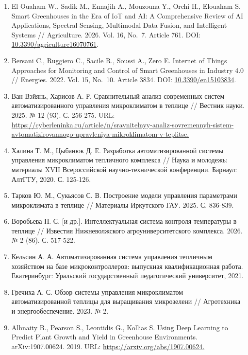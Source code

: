 \documentclass[a4paper,14pt]{extarticle}
\providecommand{\tightlist}{%
  \setlength{\itemsep}{0pt}\setlength{\parskip}{0pt}}
\begin{document}
\begin{enumerate}
\def\labelenumi{\arabic{enumi}.}
\tightlist
\item
  El Ouaham W., Sadik M., Ennajih A., Mouzouna Y., Orchi H., Elouaham S.
  Smart Greenhouses in the Era of IoT and AI: A Comprehensive Review of
  AI Applications, Spectral Sensing, Multimodal Data Fusion, and
  Intelligent Systems // Agriculture. 2026. Vol. 16, No.~7. Article 761.
  DOI:
  \href{https://doi.org/10.3390/agriculture16070761}{10.3390/agriculture16070761}.
\item
  Bersani C., Ruggiero C., Sacile R., Soussi A., Zero E. Internet of
  Things Approaches for Monitoring and Control of Smart Greenhouses in
  Industry 4.0 // Energies. 2022. Vol. 15, No.~10. Article 3834. DOI:
  \href{https://doi.org/10.3390/en15103834}{10.3390/en15103834}.
\item
  Ван Вэйянь, Харисов А. Р. Сравнительный анализ современных систем
  автоматизированного управления микроклиматом в теплице // Вестник
  науки. 2025. № 12 (93). С. 256-275. URL:
  \url{https://cyberleninka.ru/article/n/sravnitelnyy-analiz-sovremennyh-sistem-avtomatizirovannogo-upravleniya-mikroklimatom-v-teplitse.}
\item
  Халина Т. М., Цыбанюк Д. Е. Разработка автоматизированной системы
  управления микроклиматом тепличного комплекса // Наука и молодежь:
  материалы XVII Всероссийской научно-технической конференции. Барнаул:
  АлтГТУ, 2020. С. 125-126.
\item
  Тарков Ю. М., Сукьясов С. В. Построение модели управления параметрами
  микроклимата в теплице // Материалы Иркутского ГАУ. 2025. С. 836-839.
\item
  Воробьева Н. С. {[}и др.{]}. Интеллектуальная система контроля
  температуры в теплице // Известия Нижневолжского агроуниверситетского
  комплекса. 2026. № 2 (86). С. 517-522.
\item
  Кельсин А. А. Автоматизированная система управления тепличным
  хозяйством на базе микроконтроллеров: выпускная квалификационная
  работа. Екатеринбург: Уральский государственный педагогический
  университет, 2021.
\item
  Гречиха А. С. Обзор системы управления микроклиматом
  автоматизированной теплицы для выращивания микрозелени // Агротехника
  и энергообеспечение. 2023. № 2.
\item
  Alhnaity B., Pearson S., Leontidis G., Kollias S. Using Deep Learning
  to Predict Plant Growth and Yield in Greenhouse Environments.
  arXiv:1907.00624. 2019. URL: \url{https://arxiv.org/abs/1907.00624.}

\end{enumerate}
\end{document}
